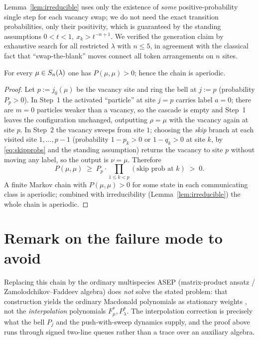 \begin{qthreeremark}
Lemma~\ref{lem:irreducible} uses only the existence of \emph{some} positive-probability
single step for each vacancy swap; we do not need the exact transition probabilities,
only their positivity, which is guaranteed by the standing assumptions
$0<t<1,\ x_k>t^{-n+1}$. We verified the generation claim by exhaustive search for all
restricted $\lambda$ with $n\le5$, in agreement with the classical fact that
``swap-the-blank'' moves connect all token arrangements on $n$ sites.
\end{qthreeremark}

\begin{qthreelemma}[aperiodicity]\label{lem:aperiodic}
For every $\mu\in S_n(\lambda)$ one has $P(\mu,\mu)>0$; hence the chain is aperiodic.
\end{qthreelemma}

\begin{proof}
Let $p:=j_0(\mu)$ be the vacancy site and ring the bell at $j:=p$ (probability
$P_p>0$). In Step~1 the activated ``particle'' at site $j=p$ carries label
$a=0$; there are $m=0$ particles weaker than a vacancy, so the cascade is empty
and Step~1 leaves the configuration unchanged, outputting $\rho=\mu$ with the
vacancy again at site $p$. In Step~2 the vacancy sweeps from site $1$; choosing
the \emph{skip} branch at each visited site $1,\dots,p-1$ (probability $1-p_k>0$
or $1-q_k>0$ at site $k$, by \eqref{eq:skipprobs} and the standing assumption)
returns the vacancy to site $p$ without moving any label, so the output is
$\nu=\mu$. Therefore
\[
P(\mu,\mu)\;\ge\;P_p\cdot\!\!\prod_{1\le k<p}\!(\text{skip prob at }k)\;>\;0 .
\]
A finite Markov chain with $P(\mu,\mu)>0$ for some state in each communicating
class is aperiodic; combined with irreducibility (Lemma~\ref{lem:irreducible})
the whole chain is aperiodic.
\end{proof}

\section*{Remark on the failure mode to avoid}

Replacing this chain by the ordinary multispecies ASEP (matrix-product ansatz /
Zamolodchikov--Faddeev algebra) does \emph{not} solve the stated problem: that
construction yields the ordinary Macdonald polynomials as stationary weights
\cite{CMW22,AMW25}, not the \emph{interpolation} polynomials $F^*_\mu,P^*_\lambda$.
The interpolation correction is precisely what the bell $P_j$ and the
push-with-sweep dynamics supply, and the proof above runs through signed
two-line queues rather than a trace over an auxiliary algebra.

